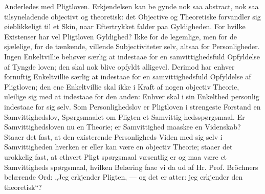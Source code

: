 \documentclass[12pt]{book}
\newcommand{\opage}[1]{\marginnote{\footnotesize\textit{[#1]}}}
\begin{document}
Anderledes med Pligtloven. Erkjendelsen kan be\-%
gynde nok saa abstract, nok saa tilsyneladende objectivt
og theoretisk: det Objective og Theoretiske forvandler
sig øieblikkeligt til et Skin, naar Eftertrykket falder paa
Gyldigheden. For hvilke Existenser har vel Pligtloven
Gyldighed? Ikke for de legemlige, men for de sjælelige,
for de tænkende, villende Subjectiviteter selv, altsaa for
Personligheder. Ingen Enkeltvillie behøver særlig at
indestaae for en samvittighedsfuld Opfyldelse af Tyngde\-%
loven; den skal nok blive opfyldt alligevel. Derimod
har enhver fornuftig Enkeltvillie særlig at indestaae for
en samvittighedsfuld Opfyldelse af Pligtloven; den ene
Enkeltvillie skal ikke i Kraft af nogen objectiv Theorie,
uleilige sig med at indestaae for den anden: Enhver skal
i sin Enkelthed personlig indestaae for sig selv. Som
Personlighedslov er Pligtloven i strengeste Forstand en
Samvittighedslov, Spørgsmaalet om Pligten et Samvittig\-%
hedsspørgsmaal. Er Samvittighedsloven nu en Theorie; er
Samvittighed maaskee en Videnskab? Staaer det fast, at
den existerende Personligheds Viden med sig selv i
Samvittigheden hverken er eller kan være en objectiv
Theorie; staaer det urokkelig fast, at ethvert Pligt\-%
spørgsmaal væsentlig er og maa være et Samvittigheds\-%
spørgsmaal, hvilken Belæring faae vi da ud af Hr. Prof.
\opage{29}\setcounter{footnote}{0}%
Bröchners belærende Ord: „Jeg erkjender Pligten, --- og
det er atter: jeg erkjender den theoretisk“?
\end{document}
